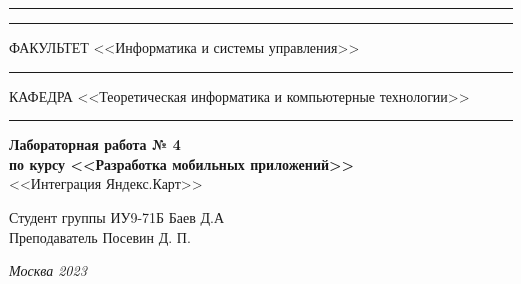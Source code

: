 \documentclass[a4paper, 14pt]{extarticle}
\begin{document}
\begin{titlepage}
\vspace{-25pt}
\hspace{-35pt}\rule{\textwidth}{2.3pt}

\vspace*{-20.3pt}
\hspace{-35pt}\rule{\textwidth}{0.4pt}

\vspace{1.5ex}
\hspace{-35pt} \noindent \small ФАКУЛЬТЕТ\hspace{80pt} <<Информатика и системы управления>>

\vspace*{-16pt}
\hspace{47pt}\rule{0.83\textwidth}{0.4pt}

\vspace{0.5ex}
\hspace{-35pt} \noindent \small КАФЕДРА\hspace{50pt} <<Теоретическая информатика и компьютерные технологии>>

\vspace*{-16pt}
\hspace{30pt}\rule{0.866\textwidth}{0.4pt}
  
\vspace{11em}

\begin{center}
\Large {\bf Лабораторная работа № 4} \\ 
\large {\bf по курсу <<Разработка мобильных приложений>>} \\
\large <<Интеграция Яндекс.Карт>> 
\end{center}\normalsize

\vspace{8em}


\begin{flushright}
  {Студент группы ИУ9-71Б Баев Д.А \hspace*{15pt}\\ 
  \vspace{2ex}
  Преподаватель Посевин Д. П.\hspace*{15pt}}
\end{flushright}

\bigskip

\vfill
 

\begin{center}
\textsl{Москва 2023}
\end{center}
\end{titlepage}
\end{document}
